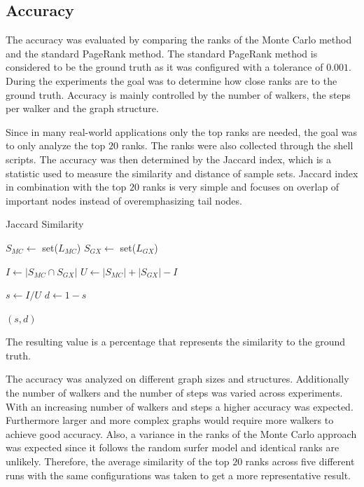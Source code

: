 \subsection{Accuracy}
The accuracy was evaluated by comparing the ranks of the Monte Carlo method and the standard PageRank method. The standard PageRank method is considered to be the ground truth as it was configured with a tolerance of $0.001$. During the experiments the goal was to determine how close ranks are to the ground truth. Accuracy is mainly controlled by the number of walkers, the steps per walker and the graph structure. \par

Since in many real-world applications only the top ranks are needed, the goal was to only analyze the top $20$ ranks. The ranks were also collected through the shell scripts. The accuracy was then determined by the Jaccard index, which is a statistic used to measure the similarity and distance of sample sets. Jaccard index in combination with the top $20$ ranks is very simple and focuses on overlap of important nodes instead of overemphasizing tail nodes.

\vspace{1.0em}
\begin{algorithm}[H]
\caption{Jaccard Similarity}

$S_{MC} \gets$ set($L_{MC}$) \;
$S_{GX} \gets$ set($L_{GX}$) \;

$I \gets |S_{MC} \cap S_{GX}|$ \;  
$U \gets |S_{MC}| + |S_{GX}| - I$ \; 

$s \gets I / U$ \;
$d \gets 1 - s$ \;

\Return $(s, d)$ \;
\end{algorithm}
\vspace{1.0em}

The resulting value is a percentage that represents the similarity to the ground truth. \par

The accuracy was analyzed on different graph sizes and structures. Additionally the number of walkers and the number of steps was varied across experiments. With an increasing number of walkers and steps a higher accuracy was expected. Furthermore larger and more complex graphs would require more walkers to achieve good accuracy. Also, a variance in the ranks of the Monte Carlo approach was expected since it follows the random surfer model and identical ranks are unlikely. Therefore, the average similarity of the top $20$ ranks across five different runs with the same configurations was taken to get a more representative result.


